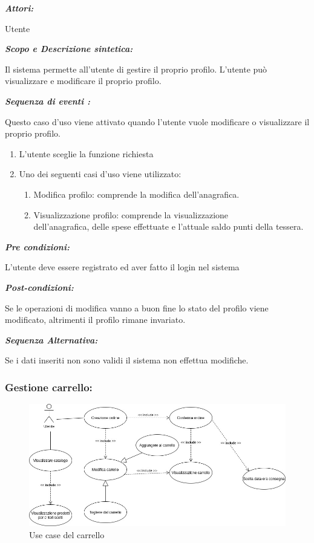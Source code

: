 \documentclass{article}
\begin{document}
\begin{mdframed}
	\noindent\textit{\textbf{Attori:}}


	Utente


	\noindent\textit{\textbf{Scopo e Descrizione sintetica:}}


	Il sistema permette all'utente di gestire il proprio profilo.
	L’utente può visualizzare e modificare il proprio profilo.

	\noindent\textit{\textbf{Sequenza di eventi :}}

	Questo caso d’uso viene attivato quando l’utente vuole modificare o visualizzare il proprio profilo.
	\begin{enumerate}
		\item L’utente sceglie la funzione richiesta
		\item Uno dei seguenti casi d’uso viene utilizzato:
		      \begin{enumerate}
			      \item{ Modifica profilo:
			            comprende la modifica dell'anagrafica.}
			      \item{Visualizzazione profilo: comprende la visualizzazione\\dell'anagrafica,
			            delle spese effettuate e l'attuale saldo punti della tessera.}
		      \end{enumerate}
	\end{enumerate}

	\noindent\textit{\textbf{Pre condizioni:}}


	L’utente deve essere registrato ed aver fatto il login 	nel sistema

	\noindent\textit{\textbf{Post-condizioni:}}


	Se le operazioni di modifica vanno a buon fine lo stato del profilo viene modificato,
	altrimenti il profilo rimane invariato.

	\noindent\textit{\textbf{Sequenza Alternativa:}}


	Se i dati inseriti non sono validi il sistema non effettua modifiche.
\end{mdframed}
\newpage

\subsubsection{Gestione carrello:}

\begin{figure}[h!]
	\centering
	\includegraphics[width=\textwidth]{UseCaseUtenteGestioneCarrello.jpg}
	\caption{Use case del carrello}
	\label{fig:UseCaseUtenteGestioneCarrello}
\end{figure}
\end{document}

